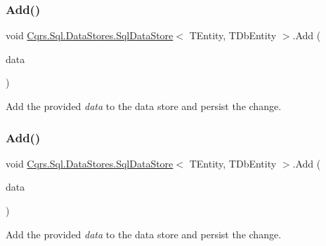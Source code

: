 \subsubsection{\texorpdfstring{Add()}{Add()}\hspace{0.1cm}{\footnotesize\ttfamily [1/2]}}
{\footnotesize\ttfamily void \hyperlink{classCqrs_1_1Sql_1_1DataStores_1_1SqlDataStore}{Cqrs.\+Sql.\+Data\+Stores.\+Sql\+Data\+Store}$<$ T\+Entity, T\+Db\+Entity $>$.Add (\begin{DoxyParamCaption}\item[{T\+Entity}]{data }\end{DoxyParamCaption})}



Add the provided {\itshape data}  to the data store and persist the change. 

\mbox{\label{classCqrs_1_1Sql_1_1DataStores_1_1SqlDataStore_a510fc3eafe64f999b99290cd8924a00e_a510fc3eafe64f999b99290cd8924a00e}} 
\subsubsection{\texorpdfstring{Add()}{Add()}\hspace{0.1cm}{\footnotesize\ttfamily [2/2]}}
{\footnotesize\ttfamily void \hyperlink{classCqrs_1_1Sql_1_1DataStores_1_1SqlDataStore}{Cqrs.\+Sql.\+Data\+Stores.\+Sql\+Data\+Store}$<$ T\+Entity, T\+Db\+Entity $>$.Add (\begin{DoxyParamCaption}\item[{I\+Enumerable$<$ T\+Entity $>$}]{data }\end{DoxyParamCaption})}



Add the provided {\itshape data}  to the data store and persist the change. 

\mbox{\label{classCqrs_1_1Sql_1_1DataStores_1_1SqlDataStore_a5065ed1d4b5c66324afcde4acc68ad6b_a5065ed1d4b5c66324afcde4acc68ad6b}} 
